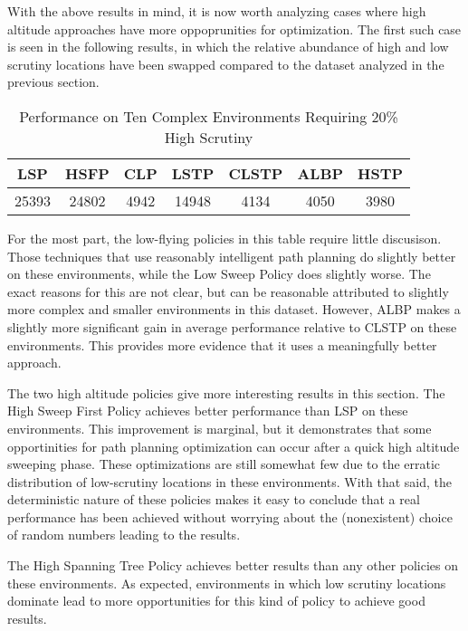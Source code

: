 With the above results in mind, it is now worth analyzing cases where high altitude approaches have more oppoprunities for optimization. The first such case is seen in the following results, in which the relative abundance of high and low scrutiny locations have been swapped compared to the dataset analyzed in the previous section.

\begin{table}[h]
\begin{center}
 \begin{tabular}{||c c c c c c c ||}
 \hline
 LSP   & HSFP  & CLP  & LSTP  & CLSTP & ALBP & HSTP \\
 \hline
 25393 & 24802 & 4942 & 14948 & 4134  & 4050 & 3980 \\
 \hline
 \end{tabular}
\end{center}
\caption{Performance on Ten Complex Environments Requiring 20\% High Scrutiny}
\end{table}

For the most part, the low-flying policies in this table require little discusison. Those techniques that use reasonably intelligent path planning do slightly better on these environments, while the Low Sweep Policy does slightly worse. The exact reasons for this are not clear, but can be reasonable attributed to slightly more complex and smaller environments in this dataset. However, ALBP makes a slightly more significant gain in average performance relative to CLSTP on these environments. This provides more evidence that it uses a meaningfully better approach.

The two high altitude policies give more interesting results in this section. The High Sweep First Policy achieves better performance than LSP on these environments. This improvement is marginal, but it demonstrates that some opportinities for path planning optimization can occur after a quick high altitude sweeping phase. These optimizations are still somewhat few due to the erratic distribution of low-scrutiny locations in these environments. With that said, the deterministic nature of these policies makes it easy to conclude that a real performance has been achieved without worrying about the (nonexistent) choice of random numbers leading to the results.

The High Spanning Tree Policy achieves better results than any other policies on these environments. As expected, environments in which low scrutiny locations dominate lead to more opportunities for this kind of policy to achieve good results.

